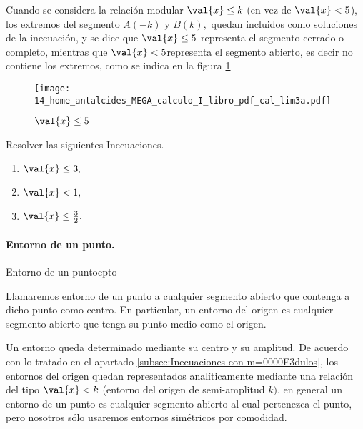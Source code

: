 \begin{apunte} \obs

Cuando se considera la relación modular $\val{x}\leq k$ (en vez de
$\ensuremath{\val{x}<5}$), los extremos del segmento $A\left(-k\right)$
y $B\left(k\right),$ quedan incluidos como soluciones de la inecuación,
y se dice que $\ensuremath{\val{x}\leq5}$ representa el segmento
cerrado o completo, mientras que $\ensuremath{\val{x}<5}$representa
el segmento abierto, es decir no contiene los extremos, como se indica
en la figura \ref{fig:cal_lim3a} 

\begin{figure}[H]
\centering\texttt{[image: 14\_home\_antalcides\_MEGA\_calculo\_I\_libro\_pdf\_cal\_lim3a.pdf]}\caption{$\val{x}\leq 5$}\label{fig:cal_lim3a}
\end{figure}
\fin

\end{apunte}

\begin{ejercicios}[]

Resolver las siguientes Inecuaciones.
\begin{enumerate}
\item $\val{x}\leq3,$
\item $\val{x}<1,$
\item $\val{x}\leq\frac{3}{2}.$
\end{enumerate}
\end{ejercicios}

\paragraph{Entorno de un punto.}

\begin{defi}{Entorno de un punto}{epto}

Llamaremos entorno de un punto a cualquier segmento abierto que contenga
a dicho punto como centro. En particular, un entorno del origen es
cualquier segmento abierto que tenga su punto medio como el origen. 

\end{defi}

Un entorno queda determinado mediante su centro y su amplitud. De
acuerdo con lo tratado en el apartado \ref{subsec:Inecuaciones-con-m=0000F3dulos},
los entornos del origen quedan representados analíticamente mediante
una relación del tipo $\val{x}<k$ (entorno del origen de semi-amplitud
$k)$. en general un entorno de un punto es cualquier segmento abierto
al cual pertenezca el punto, pero nosotros sólo usaremos entornos
simétricos por comodidad.

